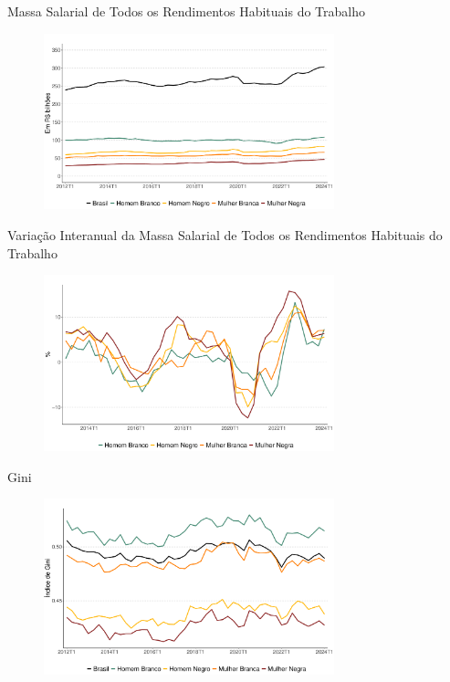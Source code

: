 \documentclass[10pt, xcolor=x11names,compress]{beamer}
\begin{document}
	
	\begin{frame}{Massa Salarial de Todos os Rendimentos Habituais do Trabalho}
		\begin{figure}
			\centering
			\includegraphics[width = 0.75\textwidth]{../figures_output/massa_habitual_br_gen_raca.pdf}
		\end{figure}
	\end{frame}
	
	\begin{frame}{Variação Interanual da Massa Salarial de Todos os Rendimentos Habituais do Trabalho}
		\begin{figure}
			\centering
			\includegraphics[width = 0.75\textwidth]{../figures_output/massa_habitual_interanual_br_gen_raca.pdf}
		\end{figure}
	\end{frame}
	
	
	
	\begin{frame}{Gini}
		\begin{figure}
			\centering
			\includegraphics[width = 0.75\textwidth]{../figures_output/gini_br_gen_raca.pdf}
		\end{figure}
	\end{frame}
	
\end{document}
